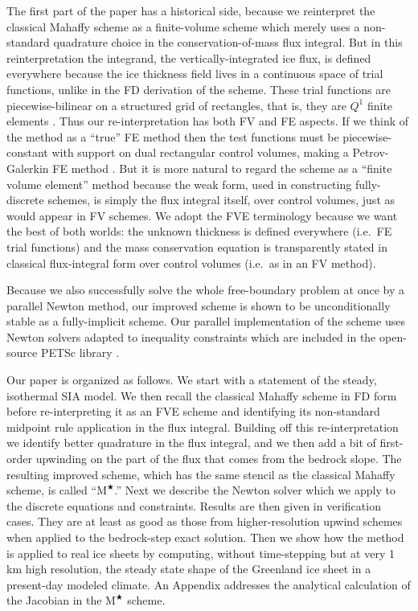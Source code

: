 \documentclass[twocolumn,letterpaper]{igs}
\newcommand{\Mstar}{$\text{M}^{\bigstar}$\xspace}
\begin{document}
The first part of the paper has a historical side, because we reinterpret the classical Mahaffy scheme as a finite-volume \citep[FV;][]{LeVeque2002} scheme which merely uses a non-standard quadrature choice in the conservation-of-mass flux integral.  But in this reinterpretation the integrand, the vertically-integrated ice flux, is defined everywhere because the ice thickness field lives in a continuous space of trial functions, unlike in the FD derivation of the scheme.  These trial functions are piecewise-bilinear on a structured grid of rectangles, that is, they are $Q^1$ finite elements \citep{Elmanetal2005}.  Thus our re-interpretation has both FV and FE aspects.  If we think of the method as a ``true'' FE method then the test functions must be piecewise-constant with support on dual rectangular control volumes, making a Petrov-Galerkin FE method \citep{Elmanetal2005}.  But it is more natural to regard the scheme as a ``finite volume element'' \citep[FVE;][]{Cai1990,EwingLinLin2002} method because the weak form, used in constructing fully-discrete schemes, is simply the flux integral itself, over control volumes, just as would appear in FV schemes.  We adopt the FVE terminology because we want the best of both worlds: the unknown thickness is defined everywhere (i.e.~FE trial functions) and the mass conservation equation is transparently stated in classical flux-integral form over control volumes (i.e.~as in an FV method).

Because we also successfully solve the whole free-boundary problem at once by a parallel Newton method, our improved scheme is shown to be unconditionally stable as a fully-implicit scheme.  Our parallel implementation of the scheme uses Newton solvers adapted to inequality constraints \citep{BensonMunson2006} which are included in the open-source PETSc library \citep{Balayetal2014}.

Our paper is organized as follows.  We start with a statement of the steady, isothermal SIA model.  We then recall the classical Mahaffy scheme in FD form before re-interpreting it as an FVE scheme and identifying its non-standard midpoint rule application in the flux integral.  Building off this re-interpretation we identify better quadrature in the flux integral, and we then add a bit of first-order upwinding on the part of the flux that comes from the bedrock slope.  The resulting improved scheme, which has the same stencil as the classical Mahaffy scheme, is called ``\Mstar.''  Next we describe the Newton solver which we apply to the discrete equations and constraints.  Results are then given in verification cases.  They are at least as good as those from higher-resolution upwind schemes when applied to the \cite{JaroschSchoofAnslow2013} bedrock-step exact solution.  Then we show how the method is applied to real ice sheets by computing, without time-stepping but at very 1 km high resolution, the steady state shape of the Greenland ice sheet in a present-day modeled climate.  An Appendix addresses the analytical calculation of the Jacobian in the \Mstar scheme.
\end{document}
